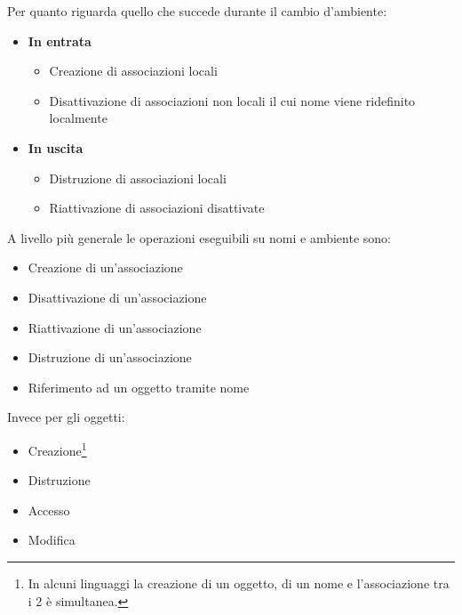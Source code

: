 \documentclass{article}
\begin{document}
\vspace{5pt}

Per quanto riguarda quello che succede durante il cambio d'ambiente:
\begin{itemize}
    \item \textbf{In entrata}

        \begin{itemize}
            \item Creazione di associazioni locali
            \item Disattivazione di associazioni non locali il cui nome viene ridefinito localmente
        \end{itemize}
    
    \item \textbf{In uscita}

        \begin{itemize}
            \item Distruzione di associazioni locali
            \item Riattivazione di associazioni disattivate\newline
        \end{itemize}
    
\end{itemize}

A livello più generale le operazioni eseguibili su nomi e ambiente sono:
\begin{itemize}
    \item Creazione di un'associazione
    \item Disattivazione di un'associazione
    \item Riattivazione di un'associazione
    \item Distruzione di un'associazione
    \item Riferimento ad un oggetto tramite nome
\end{itemize}

\vspace{3pt}

Invece per gli oggetti:
\begin{itemize}
    \item Creazione\footnote{In alcuni linguaggi la creazione di un oggetto, di un nome e l'associazione tra i 2 è simultanea.}
    \item Distruzione
    \item Accesso
    \item Modifica\newline
\end{itemize}
\end{document}
